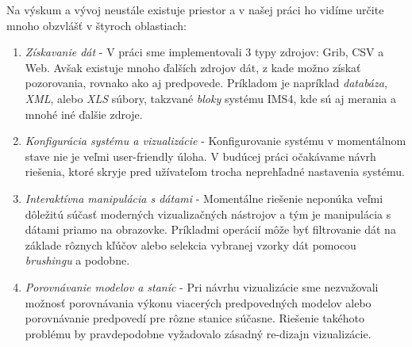 Na výskum a vývoj neustále existuje priestor a v našej práci ho vidíme určite mnoho obzvlášť v štyroch oblastiach:
\begin{enumerate}
	\item \textit{Získavanie dát} - V práci sme implementovali 3 typy zdrojov: Grib, CSV a Web. Avšak existuje mnoho ďalších zdrojov dát, z kade možno získať pozorovania, rovnako ako aj predpovede. Príkladom je napríklad \textit{databáza}, \textit{XML}, alebo \textit{XLS} súbory, takzvané \textit{bloky} systému IMS4, kde sú aj merania a mnohé iné ďalšie zdroje. 
	\item \textit{Konfigurácia systému a vizualizácie} - Konfigurovanie systému v momentálnom stave nie je veľmi user-friendly úloha. V budúcej práci očakávame návrh riešenia, ktoré skryje pred užívateľom trocha neprehľadné nastavenia systému.
	\item \textit{Interaktívna manipulácia s dátami} - Momentálne riešenie neponúka veľmi dôležitú súčasť moderných vizualizačných nástrojov a tým je manipulácia s dátami priamo na obrazovke. Príkladmi operácií môže byť filtrovanie dát na základe rôznych kľúčov alebo selekcia vybranej vzorky dát pomocou \textit{brushingu} a podobne.
	\item \textit{Porovnávanie modelov a staníc} - Pri návrhu vizualizácie sme nezvažovali možnosť porovnávania výkonu viacerých predpovedných modelov alebo porovnávanie predpovedí pre rôzne stanice súčasne. Riešenie takéhoto problému by pravdepodobne vyžadovalo zásadný re-dizajn vizualizácie.
\end{enumerate}